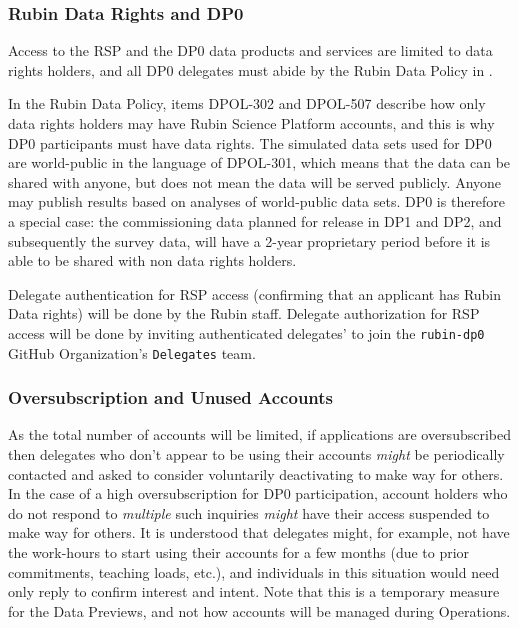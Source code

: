 \documentclass[DM,lsstdraft,authoryear,toc]{lsstdoc}
\begin{document}
\subsubsection{Rubin Data Rights and DP0}

Access to the RSP and the DP0 data products and services are limited to data rights holders, and all DP0 delegates must abide by the Rubin Data Policy in .

In the Rubin Data Policy, items DPOL-302 and DPOL-507 describe how only data rights holders may have Rubin Science Platform accounts, and this is why DP0 participants must have data rights.
The simulated data sets used for DP0 are world-public in the language of DPOL-301, which means that the data can be shared with anyone, but does not mean the data will be served publicly.
Anyone may publish results based on analyses of world-public data sets.
DP0 is therefore a special case: the commissioning data planned for release in DP1 and DP2, and subsequently the survey data, will have a 2-year proprietary period before it is able to be shared with non data rights holders.

Delegate authentication for RSP access (confirming that an applicant has Rubin Data rights) will be done by the Rubin staff.
Delegate authorization for RSP access will be done by inviting authenticated delegates' to join the {\tt rubin-dp0} GitHub Organization's {\tt Delegates} team. 


\subsubsection{Oversubscription and Unused Accounts}

As the total number of accounts will be limited, if applications are oversubscribed then delegates who don't appear to be using their accounts {\it might} be periodically contacted and asked to consider voluntarily deactivating to make way for others.
In the case of a high oversubscription for DP0 participation, account holders who do not respond to \emph{multiple} such inquiries \emph{might} have their access suspended to make way for others.
It is understood that delegates might, for example, not have the work-hours to start using their accounts for a few months (due to prior commitments, teaching loads, etc.), and individuals in this situation would need only reply to confirm interest and intent. 
Note that this is a temporary measure for the Data Previews, and not how accounts will be managed during Operations.
\end{document}
